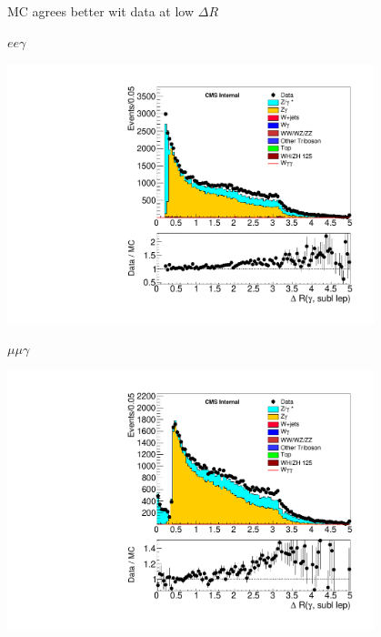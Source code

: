 \documentclass{beamer}
\begin{document}
 {

    MC agrees better wit data at low $\Delta R$

    \bc
    
        $e e \gamma$

        \includegraphics[width=0.8\textwidth]{Plots/m_leplep_elelph_phsubllepDR_newOlap.pdf}


        $\mu\mu \gamma$

        \includegraphics[width=0.8\textwidth]{Plots/m_leplep_mumuph_phsubllepDR_newOlap.pdf}

    \ec
}
\end{document}
